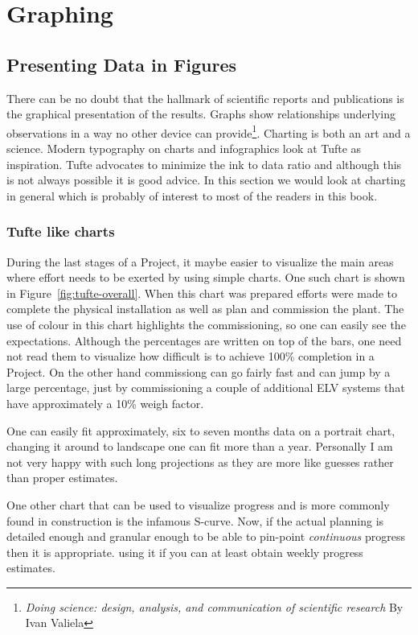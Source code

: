\documentclass[a4paper]{scrbook}
\begin{document}
\part{Graphing}
\chapter{Presenting Data in Figures}

There can be no doubt that the hallmark of scientific reports and publications is the graphical presentation of the results. Graphs show relationships underlying observations in a way no other device can provide\footnote{\textit{Doing science: design, analysis, and communication of scientific research}
 By Ivan Valiela}. 
Charting is both an art and a science. Modern typography on charts and infographics look at Tufte as inspiration.
Tufte advocates to minimize the ink to data ratio and although this is not always possible it is good advice.
In this section we would look at charting in general which is probably of interest to most of the readers
in this book. 

\section{Tufte like charts}

During the last stages of a Project, it maybe easier to visualize the
main areas where effort needs to be exerted by using simple charts. One
such chart is shown in Figure~\ref{fig:tufte-overall}. When this chart
was prepared efforts were made to complete the physical installation
as well as plan and commission the plant. The use of colour in this
chart highlights the commissioning, so one can easily see the expectations. Although the percentages are written on top of the bars,
one need not read them to visualize how difficult is to achieve
100\% completion in a Project. On the other hand commissiong can go
fairly fast and can jump by a large percentage, just by
commissioning a couple of additional ELV systems that have approximately
a 10\% weigh factor.

One can easily fit approximately, six to seven months data on
a portrait chart, changing it around to landscape one can fit
more than a year. Personally I am not very happy with such long
projections as they are more like guesses rather than proper estimates.

One other chart that can be used to visualize progress and is more
commonly found in construction is the infamous S-curve. Now, if
the actual planning is detailed enough and granular enough to be
able to pin-point \textit{continuous} progress then it is
appropriate. using it if you can at least obtain weekly progress
estimates.
\end{document}
